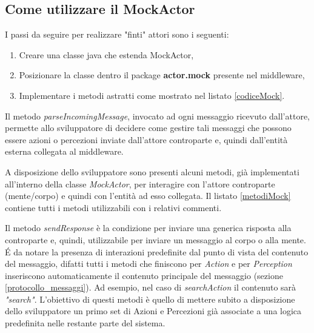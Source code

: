 \subsection{Come utilizzare il MockActor}

I passi da seguire per realizzare "finti" attori sono i seguenti:

\begin{enumerate}
    \item Creare una classe java che estenda MockActor,
    \item Posizionare la classe dentro il package \textbf{actor.mock} presente nel middleware,
    \item Implementare i metodi astratti come mostrato nel listato \ref{codiceMock}.
\end{enumerate}



Il metodo \textit{parseIncomingMessage}, invocato ad ogni messaggio ricevuto dall'attore, permette allo sviluppatore di decidere come gestire tali messaggi che possono essere azioni o percezioni inviate dall'attore controparte e, quindi dall'entità esterna collegata al middleware.

\medskip

A disposizione dello sviluppatore sono presenti alcuni metodi, già implementati all'interno della classe \textit{MockActor}, per interagire con l'attore controparte (mente/corpo) e quindi con l'entità ad esso collegata. Il listato \ref{metodiMock} contiene tutti i metodi utilizzabili con i relativi commenti. 



Il metodo \textit{sendResponse} è la condizione per inviare una generica risposta alla controparte e, quindi, utilizzabile per inviare un messaggio al corpo o alla mente. \'E da notare la presenza di interazioni predefinite dal punto di vista del contenuto del messaggio, difatti tutti i metodi che finiscono per \textit{Action} e per \textit{Perception} inseriscono automaticamente il contenuto principale del messaggio (sezione \ref{protocollo_messaggi}). Ad esempio, nel caso di \textit{searchAction} il contenuto sarà \textit{"search"}. L'obiettivo di questi metodi è quello di mettere subito a disposizione dello sviluppatore un primo set di Azioni e Percezioni già associate a una logica predefinita nelle restante parte del sistema.

